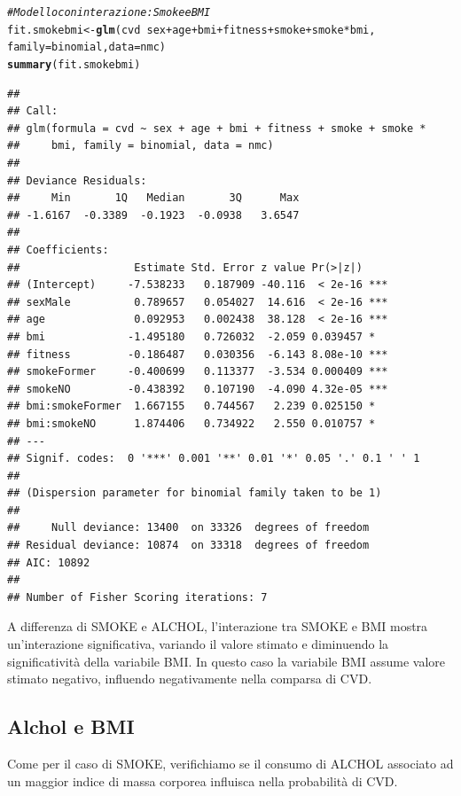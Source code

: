 \documentclass{article}\usepackage[]{graphicx}\usepackage[]{xcolor}
\makeatletter
\newcommand{\hlcom}[1]{\textcolor[rgb]{0.678,0.584,0.686}{\textit{#1}}}%
\newcommand{\hlopt}[1]{\textcolor[rgb]{0,0,0}{#1}}%
\newcommand{\hlstd}[1]{\textcolor[rgb]{0.345,0.345,0.345}{#1}}%
\newcommand{\hlkwb}[1]{\textcolor[rgb]{0.69,0.353,0.396}{#1}}%
\newcommand{\hlkwc}[1]{\textcolor[rgb]{0.333,0.667,0.333}{#1}}%
\newcommand{\hlkwd}[1]{\textcolor[rgb]{0.737,0.353,0.396}{\textbf{#1}}}%
\newenvironment{kframe}{%
 \def\at@end@of@kframe{}%
 \ifinner\ifhmode%
  \def\at@end@of@kframe{\end{minipage}}%
  \begin{minipage}{\columnwidth}%
 \fi\fi%
 \def\FrameCommand##1{\hskip\@totalleftmargin \hskip-\fboxsep
 \colorbox{shadecolor}{##1}\hskip-\fboxsep
     \hskip-\linewidth \hskip-\@totalleftmargin \hskip\columnwidth}%
 \MakeFramed {\advance\hsize-\width
   \@totalleftmargin\z@ \linewidth\hsize
   \@setminipage}}%
 {\par\unskip\endMakeFramed%
 \at@end@of@kframe}
\newenvironment{knitrout}{}{} %
\makeatother
\begin{document}
\begin{knitrout}
\color{fgcolor}\begin{kframe}
\begin{alltt}
\hlcom{#Modello con interazione: Smoke e BMI}
\hlstd{fit.smokebmi} \hlkwb{<-} \hlkwd{glm}\hlstd{(cvd}\hlopt{~}\hlstd{sex}\hlopt{+}\hlstd{age}\hlopt{+}\hlstd{bmi}\hlopt{+}\hlstd{fitness}\hlopt{+}\hlstd{smoke}\hlopt{+}\hlstd{smoke}\hlopt{*}\hlstd{bmi,}
                    \hlkwc{family}\hlstd{=binomial,} \hlkwc{data}\hlstd{=nmc)}
\hlkwd{summary}\hlstd{(fit.smokebmi)}
\end{alltt}
\begin{verbatim}
## 
## Call:
## glm(formula = cvd ~ sex + age + bmi + fitness + smoke + smoke * 
##     bmi, family = binomial, data = nmc)
## 
## Deviance Residuals: 
##     Min       1Q   Median       3Q      Max  
## -1.6167  -0.3389  -0.1923  -0.0938   3.6547  
## 
## Coefficients:
##                  Estimate Std. Error z value Pr(>|z|)    
## (Intercept)     -7.538233   0.187909 -40.116  < 2e-16 ***
## sexMale          0.789657   0.054027  14.616  < 2e-16 ***
## age              0.092953   0.002438  38.128  < 2e-16 ***
## bmi             -1.495180   0.726032  -2.059 0.039457 *  
## fitness         -0.186487   0.030356  -6.143 8.08e-10 ***
## smokeFormer     -0.400699   0.113377  -3.534 0.000409 ***
## smokeNO         -0.438392   0.107190  -4.090 4.32e-05 ***
## bmi:smokeFormer  1.667155   0.744567   2.239 0.025150 *  
## bmi:smokeNO      1.874406   0.734922   2.550 0.010757 *  
## ---
## Signif. codes:  0 '***' 0.001 '**' 0.01 '*' 0.05 '.' 0.1 ' ' 1
## 
## (Dispersion parameter for binomial family taken to be 1)
## 
##     Null deviance: 13400  on 33326  degrees of freedom
## Residual deviance: 10874  on 33318  degrees of freedom
## AIC: 10892
## 
## Number of Fisher Scoring iterations: 7
\end{verbatim}
\end{kframe}
\end{knitrout}
    
    A differenza di SMOKE e ALCHOL, l'interazione tra SMOKE e BMI 
    mostra un'interazione significativa, variando il valore stimato e diminuendo la 
    significatività della variabile BMI. In questo caso la variabile BMI assume 
    valore stimato negativo, influendo negativamente nella comparsa di CVD.
    
  \subsection{Alchol e BMI}
    Come per il caso di SMOKE, verifichiamo se il consumo di ALCHOL associato ad un
    maggior indice di massa corporea influisca nella probabilità di CVD.
    
\end{document}
